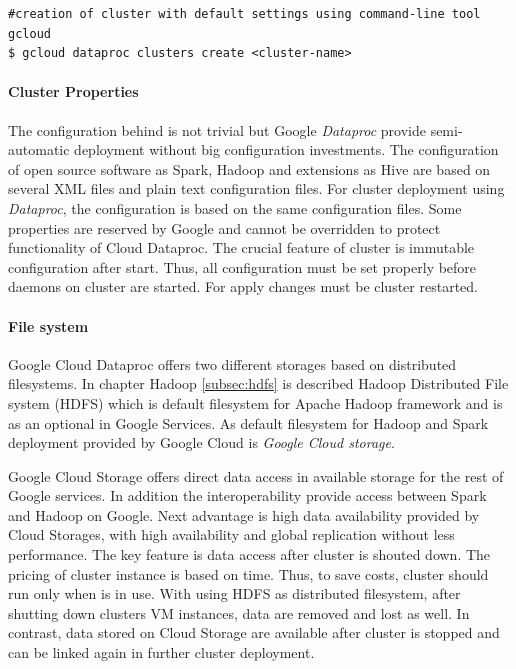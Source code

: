 \documentclass[a4paper,12pt,oneside]{report}
\begin{document}
	
	
	\begin{footnotesize}
		\begin{lstlisting}[style=mybash]
#creation of cluster with default settings using command-line tool gcloud
$ gcloud dataproc clusters create <cluster-name>
		\end{lstlisting}
	\end{footnotesize}
	
	
	\paragraph{Cluster Properties} The configuration behind is not trivial but Google
	\textit{Dataproc} provide 	semi-automatic deployment without big configuration investments.
	The configuration of open source software as Spark, Hadoop  and extensions as Hive	are based 
	on several XML files and plain text configuration files. For cluster deployment 
	using \textit{Dataproc}, the configuration is based on the same configuration	files. Some 
	properties are reserved by Google and cannot be overridden 
	to protect functionality of Cloud Dataproc. The crucial feature of cluster is
	immutable 	configuration after start. Thus, all configuration must be set 
	properly before daemons on cluster are started. For apply changes must be cluster
	restarted. 
	
	\paragraph{File system}
	Google Cloud Dataproc offers two different storages based on distributed
	filesystems. In chapter Hadoop \ref{subsec:hdfs} is described Hadoop Distributed File
	system (HDFS) which is default filesystem for Apache Hadoop framework and is as an optional in Google
	Services. As default filesystem for Hadoop and Spark deployment provided by Google Cloud is
	 \textit{Google Cloud storage}. 
	
	Google Cloud Storage offers direct data access in available storage for the
	rest of Google 	services. In addition the interoperability provide access between Spark and
	Hadoop on Google. 	Next advantage is high data availability provided by Cloud
	Storages, with high availability and global replication without less
	performance. The key feature is data access after cluster is shouted down. The 
	pricing of cluster instance is based on time. Thus, to save costs, cluster
	should run only when is in use. With using HDFS as distributed filesystem, after 
	shutting down clusters VM instances, data are removed and lost as well. In contrast,
	data stored on 	Cloud Storage are available after cluster is stopped and 
	can be linked again in further cluster deployment.
	
\end{document}
